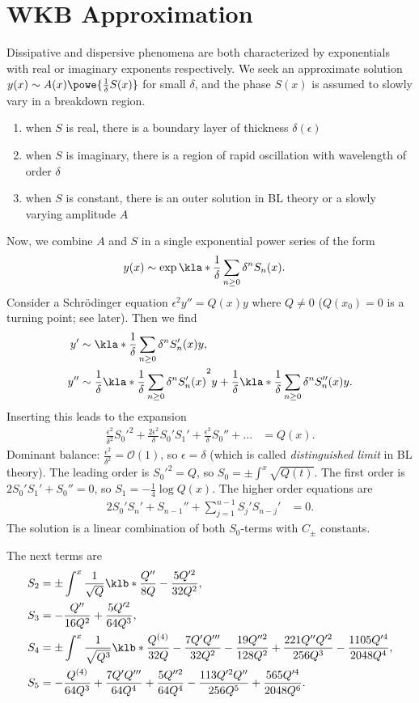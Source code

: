 \documentclass[english, parskip=full]{scrbook}
\newcommand{\note}[1]{\begin{tcolorbox}[colback=colorbackgroundnote,colframe=colornote, breakable,enhanced]#1\end{tcolorbox}}
\begin{document}
\section{WKB Approximation}
Dissipative and dispersive phenomena are both characterized by exponentials with real or imaginary exponents respectively.
We seek an approximate solution $y(x)\sim A(x) \powe{\frac{1}{\delta} S(x)}$ for small $\delta$, and the phase $S(x)$ is assumed to slowly vary in a breakdown region.
\note{\begin{enumerate}
\item when $S$ is real, there is a boundary layer of thickness $\delta(\epsilon)$
\item when $S$ is imaginary, there is a region of rapid oscillation with wavelength of order $\delta$
\item when $S$ is constant, there is an outer solution in BL theory or a slowly varying amplitude $A$
\end{enumerate}
}
Now, we combine $A$ and $S$ in a single exponential power series of the form
\begin{align}
y(x) &\sim \exp\kla*{\frac{1}{\delta} \sum_{n\ge 0} \delta^n S_n(x)}.
\end{align}
Consider a Schrödinger equation $\epsilon^2 y''=Q(x)y$ where $Q\neq 0$ ($Q(x_0)=0$ is a turning point; see later).
Then we find
\begin{align}
y' &\sim \kla*{\frac{1}{\delta} \sum_{n\ge 0} \delta^n S_n'(x)} y,\\
y'' &\sim \frac{1}{\delta} \kla*{\frac{1}{\delta} \sum_{n\ge 0} \delta^n S_n'(x)}^2 y + \frac{1}{\delta} \kla*{\frac{1}{\delta} \sum_{n\ge 0} \delta^n S_n''(x)} y.
\end{align}
Inserting this leads to the expansion
\begin{align}
\frac{\epsilon^2}{\delta^2} S_0'^2 + \frac{2\epsilon^2}{\delta} S_0'S_1' + \frac{\epsilon^2}{\delta} S_0'' + \dots &= Q(x).
\end{align}
Dominant balance: $\frac{\epsilon^2}{\delta^2} = \mathcal{O}(1)$, so $\epsilon=\delta$ (which is called \emph{distinguished limit} in BL theory).
The leading order is $S_0'^2=Q$, so $S_0=\pm \int^x \sqrt{Q(t)}$.
The first order is $2S_0'S_1'+S_0''=0$, so $S_1=-\frac{1}{4} \log Q(x)$.
The higher order equations are
\begin{align}
2S_0'S_n' + S_{n-1}'' + \sum_{j=1}^{n-1} S_j'S_{n-j}' &= 0.
\end{align}
The solution is a linear combination of both $S_0$-terms with $C_\pm$ constants.
\note{The next terms are
\begin{align}
S_2 &= \pm \int^x \frac{1}{\sqrt{Q}} \klb*{\frac{Q''}{8Q} - \frac{5Q'^2}{32Q^{2}}},\\
S_3 &= -\frac{Q''}{16Q^2} + \frac{5Q'^2}{64Q^3},\\
S_4 &= \pm \int^x \frac{1}{\sqrt{Q^3}} \klb*{\frac{Q^{(4)}}{32 Q} - \frac{7Q'Q'''}{32Q^2} - \frac{19Q''^2}{128Q^2} + \frac{221Q''Q'^2}{256 Q^3} - \frac{1105 Q'^4}{2048 Q^4}},\\
S_5 &= -\frac{Q^{(4)}}{64Q^3} + \frac{7Q'Q'''}{64Q^4} + \frac{5Q''^2}{64Q^4} - \frac{113Q'^2Q''}{256Q^5} + \frac{565Q'^4}{2048Q^6}.
\end{align}
}
\end{document}
